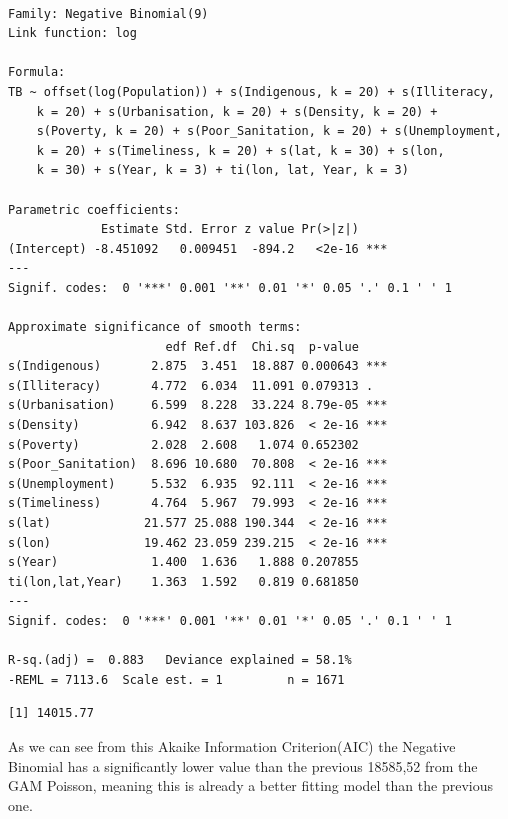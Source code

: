 \documentclass[
  letterpaper,
  DIV=11,
  numbers=noendperiod]{scrartcl}
\newenvironment{Shaded}{\begin{snugshade}}{\end{snugshade}}
\newcommand{\CommentTok}[1]{\textcolor[rgb]{0.37,0.37,0.37}{#1}}
\newcommand{\NormalTok}[1]{\textcolor[rgb]{0.00,0.23,0.31}{#1}}
\newcommand{\SpecialCharTok}[1]{\textcolor[rgb]{0.37,0.37,0.37}{#1}}
\begin{document}
\begin{verbatim}

Family: Negative Binomial(9) 
Link function: log 

Formula:
TB ~ offset(log(Population)) + s(Indigenous, k = 20) + s(Illiteracy, 
    k = 20) + s(Urbanisation, k = 20) + s(Density, k = 20) + 
    s(Poverty, k = 20) + s(Poor_Sanitation, k = 20) + s(Unemployment, 
    k = 20) + s(Timeliness, k = 20) + s(lat, k = 30) + s(lon, 
    k = 30) + s(Year, k = 3) + ti(lon, lat, Year, k = 3)

Parametric coefficients:
             Estimate Std. Error z value Pr(>|z|)    
(Intercept) -8.451092   0.009451  -894.2   <2e-16 ***
---
Signif. codes:  0 '***' 0.001 '**' 0.01 '*' 0.05 '.' 0.1 ' ' 1

Approximate significance of smooth terms:
                      edf Ref.df  Chi.sq  p-value    
s(Indigenous)       2.875  3.451  18.887 0.000643 ***
s(Illiteracy)       4.772  6.034  11.091 0.079313 .  
s(Urbanisation)     6.599  8.228  33.224 8.79e-05 ***
s(Density)          6.942  8.637 103.826  < 2e-16 ***
s(Poverty)          2.028  2.608   1.074 0.652302    
s(Poor_Sanitation)  8.696 10.680  70.808  < 2e-16 ***
s(Unemployment)     5.532  6.935  92.111  < 2e-16 ***
s(Timeliness)       4.764  5.967  79.993  < 2e-16 ***
s(lat)             21.577 25.088 190.344  < 2e-16 ***
s(lon)             19.462 23.059 239.215  < 2e-16 ***
s(Year)             1.400  1.636   1.888 0.207855    
ti(lon,lat,Year)    1.363  1.592   0.819 0.681850    
---
Signif. codes:  0 '***' 0.001 '**' 0.01 '*' 0.05 '.' 0.1 ' ' 1

R-sq.(adj) =  0.883   Deviance explained = 58.1%
-REML = 7113.6  Scale est. = 1         n = 1671
\end{verbatim}

\begin{Shaded}
\end{Shaded}

\begin{verbatim}
[1] 14015.77
\end{verbatim}

As we can see from this Akaike Information Criterion(AIC) the Negative
Binomial has a significantly lower value than the previous 18585,52 from
the GAM Poisson, meaning this is already a better fitting model than the
previous one.
\end{document}
